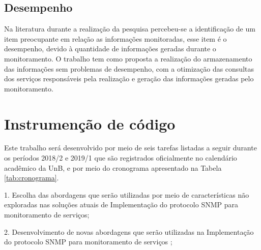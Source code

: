 \subsection{Desempenho}

Na literatura durante a realização da pesquisa percebeu-se a identificação de um item preocupante em relação as informações monitoradas, esse item é o desempenho, devido à quantidade de informações geradas durante o monitoramento. O trabalho tem como proposta a realização do armazenamento das informações sem problemas de desempenho, com a otimização das consultas dos serviços responsáveis pela realização e geração das informações geradas pelo monitoramento.       



\section{Instrumenção de código}

Este trabalho será desenvolvido por meio de seis tarefas listadas a seguir durante os períodos 2018/2 e 2019/1 que são registrados oficialmente no calendário acadêmico da UnB, e por meio do cronograma apresentado na Tabela \ref{tab:cronograma}.

	1. Escolha das abordagens que serão utilizadas por meio de características não exploradas nas soluções atuais de Implementação do protocolo SNMP para monitoramento de serviços;
  
  2. Desenvolvimento de novas abordagens que serão utilizadas na Implementação do protocolo SNMP para monitoramento de serviços ;
    
